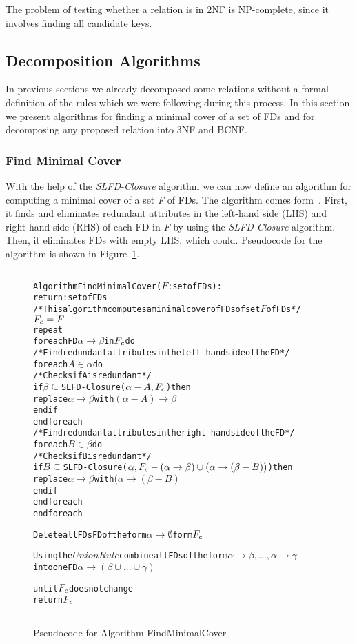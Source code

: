 The problem of testing whether a relation is in 2NF is NP-complete, 
since it involves finding all candidate keys.

\subsection{Decomposition Algorithms}
\label{sec:algdec}
In previous sections we already decomposed some relations without
a formal definition of the rules which we were following during this process. 
In this section we present algorithms for finding a minimal cover of a set of FDs and 
for decomposing any proposed relation into 3NF and BCNF.  

\subsubsection{Find Minimal Cover}  
With the help of the \textit{SLFD-Closure} algorithm we can now define an algorithm 
for computing a minimal cover of a set \textit{F} of FDs. 
The algorithm comes form~\cite[Section 6.3.1]{bdb2}. First, it finds and eliminates 
redundant attributes in the left-hand side (LHS) and right-hand side (RHS) 
of each FD in \textit{F} by using the \textit{SLFD-Closure} algorithm. Then, it eliminates FDs with 
empty LHS, which could. Pseudocode for the algorithm is shown in Figure~\ref{alg:mincov}.

\begin{figure}[htbp]
\hrule
\begin{alltt}

Algorithm FindMinimalCover(\(F\): set of FDs):
             return: set of FDs
/* This algorithm computes a minimal cover of FDs of set \(F\) of FDs */
  \(F\sb{c} = F\)
  repeat
    foreach FD \(\alpha \rightarrow \beta\) in \(F\sb{c}\) do
      /* Find redundant attributes in the left-hand side of the FD */
      foreach \(A \in \alpha\) do
        /* Checks if A is redundant */
        if \(\beta \subseteq\) SLFD-Closure(\(\alpha-A, F\sb{c}\)) then
          replace \(\alpha \rightarrow \beta\) with \((\alpha-A) \rightarrow \beta\)
        end if
      end foreach
      /* Find redundant attributes in the right-hand side of the FD */
      foreach \(B \in \beta\) do
        /* Checks if B is redundant */
        if \(B \subseteq\) SLFD-Closure(\(\alpha, F\sb{c}-(\alpha \rightarrow \beta) \cup (\alpha \rightarrow (\beta - B))\)) then
          replace \(\alpha \rightarrow \beta\) with \((\alpha \rightarrow (\beta-B)\)
        end if
      end foreach
    end foreach
    
    Delete all FDs FD of the form \(\alpha \rightarrow \emptyset\) form \(F\sb{c}\)
      
    Using the \(Union Rule\) combine all FDs of the form \(\alpha \rightarrow \beta,...,\alpha \rightarrow \gamma\)
      into one FD \(\alpha \rightarrow (\beta \cup ... \cup \gamma)\)
      
  until \(F\sb{c}\) does not change
  return \(F\sb{c}\)
\end{alltt}
\caption{Pseudocode for Algorithm FindMinimalCover}\label{alg:mincov}
\hrule
\end{figure}

